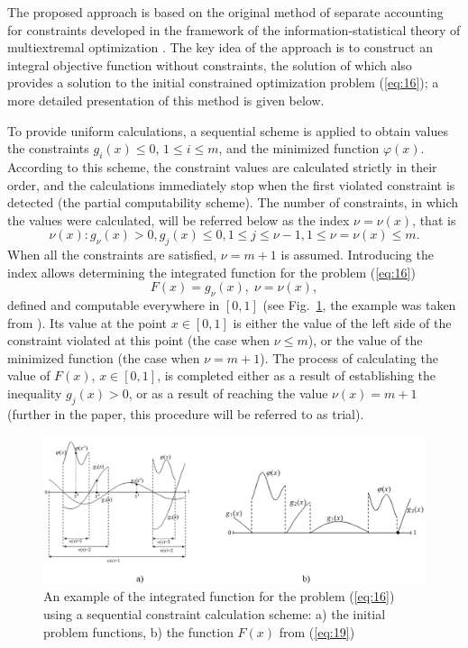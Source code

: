 \documentclass[smallextended]{svjour3}       %
\begin{document}
The proposed approach is based on the original method of separate accounting for constraints developed in the framework of the information-statistical theory of multiextremal optimization \cite{c18}. The key idea of the approach is to construct an integral objective function without constraints, the solution of which also provides a solution to the initial constrained optimization problem (\ref{eq:16}); a more detailed presentation of this method is given below.

To provide uniform calculations, a sequential scheme is applied to obtain values the constraints $g_i(x) \leq 0$, $1 \leq i \leq m$, and the minimized function $\varphi(x)$. According to this scheme, the constraint values are calculated strictly in their order, and the calculations immediately stop when the first violated constraint is detected (the partial computability scheme). The number of constraints, in which the values were calculated, will be referred below as the index $\nu=\nu(x)$, that is
\begin{equation}\label{eq:18}
\nu(x) : g_\nu(x)>0, g_j(x)\leq 0, 1 \leq j \leq \nu - 1, 1 \leq \nu = \nu(x) \leq m.
\end{equation}
When all the constraints are satisfied, $\nu=m+1$ is assumed. Introducing the index allows determining the integrated function for the problem (\ref{eq:16})
\begin{equation}\label{eq:19}
F(x)=g_\nu(x), \; \nu=\nu(x),
\end{equation}
defined and computable everywhere in $[0,1]$ (see Fig.~\ref{fig:1}, the example was taken from \cite{Book2013}). Its value at the point $x\in [0,1]$ is either the value of the left side of the constraint violated at this point (the case when $\nu \leq m$), or the value of the minimized function (the case when $\nu = m + 1$). The process of calculating the value of $F(x)$, $x\in [0,1]$, is completed either as a result of establishing the inequality $g_j(x)>0$, or as a result of reaching the value $\nu(x)=m+1$ (further in the paper, this procedure will be referred to as trial).

\begin{figure}
  \centering
  \includegraphics[width=\linewidth]{fig1}
  \caption{An example of the integrated function for the problem (\ref{eq:16}) using a sequential constraint calculation scheme: a) the initial problem functions, b) the function $F(x)$ from (\ref{eq:19})}
  \label{fig:1}
\end{figure}
\end{document}
